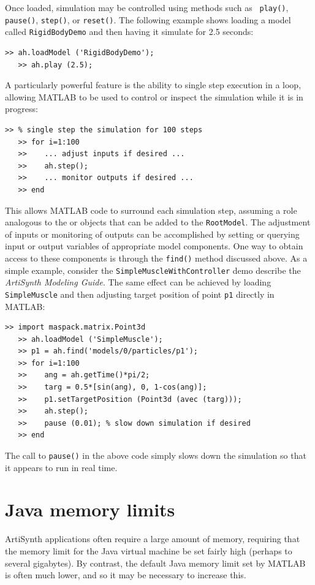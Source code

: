 \documentclass{article}
\begin{document}
Once loaded, simulation may be controlled using methods such as {\tt
play()}, {\tt pause()}, {\tt step()}, or {\tt reset()}. The following
example shows loading a model called {\tt RigidBodyDemo} and
then having it simulate for 2.5 seconds:
%
\begin{lstlisting}[]
   >> ah.loadModel ('RigidBodyDemo');
   >> ah.play (2.5);
\end{lstlisting}
%
A particularly powerful feature is the ability to single step
execution in a loop, allowing MATLAB to be used to control or inspect
the simulation while it is in progress:
%
\begin{lstlisting}[]
   >> % single step the simulation for 100 steps
   >> for i=1:100
   >>    ... adjust inputs if desired ...
   >>    ah.step();
   >>    ... monitor outputs if desired ...
   >> end
\end{lstlisting}
%
This allows MATLAB code to surround each simulation step, assuming a
role analogous to the 
or  objects that can be
added to the {\tt RootModel}.  The adjustment of inputs or monitoring
of outputs can be accomplished by setting or querying input or output
variables of appropriate model components. One way to obtain access to
these components is through the {\tt find()} method discussed above.
As a simple example, consider the {\tt SimpleMuscleWithController}
demo describe the {\it ArtiSynth Modeling Guide}. The same effect
can be achieved by loading {\tt SimpleMuscle} and then adjusting
target position of point {\tt p1} directly in MATLAB:
%
\begin{lstlisting}[]
   >> import maspack.matrix.Point3d
   >> ah.loadModel ('SimpleMuscle');
   >> p1 = ah.find('models/0/particles/p1');
   >> for i=1:100
   >>    ang = ah.getTime()*pi/2;
   >>    targ = 0.5*[sin(ang), 0, 1-cos(ang)];
   >>    p1.setTargetPosition (Point3d (avec (targ)));
   >>    ah.step();
   >>    pause (0.01); % slow down simulation if desired
   >> end
\end{lstlisting}
%
The call to {\tt pause()} in the above code simply slows down the
simulation so that it appears to run in real time.

\section{Java memory limits}
\label{memoryLimits:sec}

ArtiSynth applications often require a large amount of memory,
requiring that the memory limit for the Java virtual machine
be set fairly high (perhaps to several gigabytes). By contrast, the
default Java memory limit set by MATLAB is often much lower, and so it
may be necessary to increase this.
\end{document}
